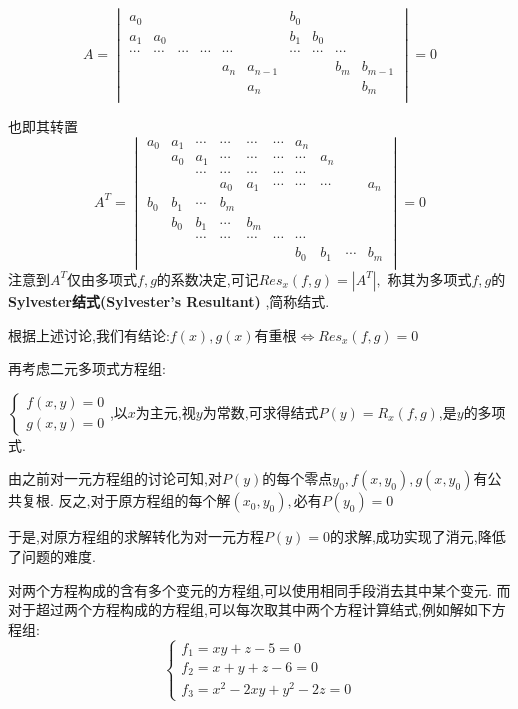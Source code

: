 	\[ A=\begin{vmatrix} 
		a_0	&	&	&	&	 &		& b_0 &		&	 &	\\
		a_1	&a_0&	&	&			&	& b_1 & b_0	&	&	\\
  \cdots &\cdots &\cdots &\cdots	&  \cdots&	& \cdots &\cdots	&	\cdots	&	\\
		 &	&	&	&a_n &a_{n-1}   &		&	& b_m  & b_{m-1} \\
		 &	&	&	&	 &a_n		&		&	&	  & b_m\\
	\end{vmatrix} = 0\]

	也即其转置
	\[A^{T}= \begin{vmatrix}
	a_0 & a_1 & \cdots & \cdots & \cdots & \cdots & a_n		&		&	&   \\
		& a_0 & a_1	   & \cdots & \cdots & \cdots & \cdots  &a_n   &	&	\\
		&	  & \cdots & \cdots & \cdots & \cdots & \cdots &		&	&	\\
		&	  &		   & a_0	& a_1	 & \cdots & \cdots & \cdots &	& a_n\\
	b_0 & b_1 & \cdots & b_m	&		 &		  &		   &		&	&   \\
		& b_0 & b_1	   & \cdots  &b_m   &	    	&		&		&	&	\\
		&	  & \cdots & \cdots & \cdots & \cdots & \cdots &		&	&	\\
		&	  &		   &		&		&		& b_0		& b_1	& \cdots & b_m\\
	\end{vmatrix} =0\]
	注意到$ A^{T}$仅由多项式$ f,g$的系数决定,可记$ Res_x(f,g)=|A^{T}|,$
	称其为多项式$ f,g$的{\bf Sylvester结式(Sylvester's Resultant) },简称结式.

	根据上述讨论,我们有结论:$ f(x),g(x)$有重根$ \Leftrightarrow Res_x(f,g) = 0$
	
	\vspace{13pt}
	再考虑二元多项式方程组:

	$ \begin{cases}
		f(x,y)=0 \\g(x,y)=0 
	\end{cases}$,以$ x$为主元,视$ y$为常数,可求得结式$ P(y) = R_x(f,g)$,是$ y$的多项式.

	由之前对一元方程组的讨论可知,对$ P(y)$的每个零点$ y_0,f(x,y_0),g(x,y_0)$有公共复根.
	反之,对于原方程组的每个解$ (x_0,y_0), $必有$ P(y_0) = 0$

	于是,对原方程组的求解转化为对一元方程$ P(y) = 0$的求解,成功实现了消元,降低了问题的难度.
	
	\vspace{13pt}
	对两个方程构成的含有多个变元的方程组,可以使用相同手段消去其中某个变元.
	而对于超过两个方程构成的方程组,可以每次取其中两个方程计算结式,例如解如下方程组:
	\[  \begin{cases} f_1 = xy+z-5 = 0\\ f_2 = x+y+z-6 = 0 \\ f_3 = x^2-2xy+y^2-2z = 0
	\end{cases}\]


